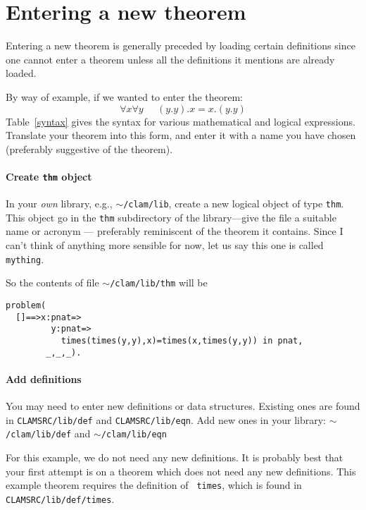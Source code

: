 \documentclass{article}
\begin{document}
\section{Entering a new theorem\label{try-new-thm}}

Entering a new theorem is generally preceded by loading certain
definitions since one cannot enter a theorem unless all the
definitions it mentions are already loaded.  

By way of example, if we wanted to enter the theorem:
%
\[ \forall x \forall y  \; \; \; \; \; 
(y.y).x = x.(y.y)
\]
Table~\ref{syntax} gives the \oyster syntax for various mathematical
and logical expressions. Translate your theorem into this form, and
enter it with a name you have chosen (preferably suggestive of the
theorem).  

\paragraph {Create {\tt thm} object}
In your {\em own\/} library, e.g., {\tt$\sim$/clam/lib}, create a new
logical object of type {\tt thm}.  This object go in the {\tt thm}
subdirectory of the library---give the file a suitable name or acronym
--- preferably reminiscent of the theorem it contains. Since I can't
think of anything more sensible for now, let us say this one is called
{\tt mything}.

So the contents of file {\tt$\sim$/clam/lib/thm} will be
\begin{verbatim}
problem(
  []==>x:pnat=>
         y:pnat=>
           times(times(y,y),x)=times(x,times(y,y)) in pnat,
        _,_,_).
\end{verbatim}

\paragraph {Add definitions}
You may need to enter new definitions or data structures. Existing
ones are found in {\tt CLAMSRC/lib/def} and {\tt CLAMSRC/lib/eqn}.
Add new ones in your library: {\tt$\sim$/clam/lib/def} and
{\tt$\sim$/clam/lib/eqn}

For this example, we do not need any new definitions. It is probably
best that your first attempt is on a theorem which does not need any
new definitions. This example theorem requires the definition of {\tt
times}, which is found in {\tt CLAMSRC/lib/def/times}.
\end{document}
